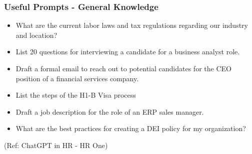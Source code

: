 \begin{frame}[fragile]\frametitle{Useful Prompts - General Knowledge}

\begin{itemize}
\item What are the current labor laws and tax regulations regarding our industry and location?
\item List 20 questions for interviewing a candidate for a business analyst role.
\item Draft a formal email to reach out to potential candidates for the CEO position of a financial services company.
\item List the steps of the H1-B Visa process
\item Draft a job description for the role of an ERP sales manager.
\item What are the best practices for creating a DEI policy for my organization?
\end{itemize}

\tiny{(Ref: ChatGPT in HR - HR One)}

\end{frame}



